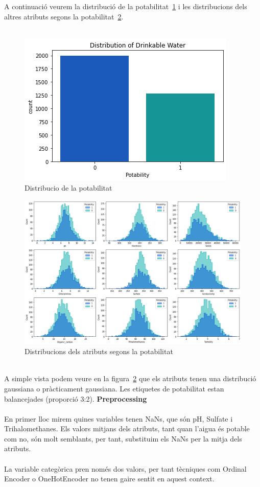 \documentclass{article}
\begin{document}
	A continuació veurem la distribució de la potabilitat~\ref{fig:distribuciopotabilitat} i les distribucions dels altres atributs segons la potabilitat~\ref{fig:distribucions}.\\
	\\
	\begin{figure}[!h]
		\centering
		\includegraphics[width=0.4\linewidth]{../images/distribucio_potabilitat}
		\caption{Distribucio de la potabilitat}
		\label{fig:distribuciopotabilitat}
	\end{figure}
	\begin{figure}[!h]
		\centering
		\includegraphics[width=0.7\linewidth]{../images/distribucions}
		\caption{Distribucions dels atributs segons la potabilitat}
		\label{fig:distribucions}
	\end{figure}\\
	A simple vista podem veure en la figura~\ref{fig:distribucions} que els atributs tenen una distribució gaussiana o pràcticament gaussiana. Les etiquetes de potabilitat estan balancejades (proporció 3:2).
	\clearpage
	\noindent
	\textbf{Preprocessing}\\
	\\
	En primer lloc mirem quines variables tenen NaNs, que són pH, Sulfate i Trihalomethanes. Els valors mitjans dels atributs, tant quan l'aigua és potable com no, són molt semblants, per tant, substituim els NaNs per la mitja dels atributs.\\
	\\
	La variable categòrica pren només dos valors, per tant tècniques com Ordinal Encoder o OneHotEncoder no tenen gaire sentit en aquest context.\\
\end{document}
